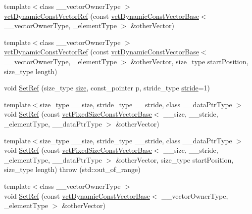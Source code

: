 \begin{DoxyCompactItemize}
\item 
{\footnotesize template$<$class \-\_\-\-\_\-vector\-Owner\-Type $>$ }\\\hyperlink{classvct_dynamic_const_vector_ref_a83a3e9d3b6116a72b45edf4999bc106a}{vct\-Dynamic\-Const\-Vector\-Ref} (const \hyperlink{classvct_dynamic_const_vector_base}{vct\-Dynamic\-Const\-Vector\-Base}$<$ \-\_\-\-\_\-vector\-Owner\-Type, \-\_\-element\-Type $>$ \&other\-Vector)
\item 
{\footnotesize template$<$class \-\_\-\-\_\-vector\-Owner\-Type $>$ }\\\hyperlink{classvct_dynamic_const_vector_ref_a168c520aca6ae854b40aea182694ef98}{vct\-Dynamic\-Const\-Vector\-Ref} (const \hyperlink{classvct_dynamic_const_vector_base}{vct\-Dynamic\-Const\-Vector\-Base}$<$ \-\_\-\-\_\-vector\-Owner\-Type, \-\_\-element\-Type $>$ \&other\-Vector, size\-\_\-type start\-Position, size\-\_\-type length)
\item 
void \hyperlink{classvct_dynamic_const_vector_ref_a25ea281066863d915ea0bd65092d94b5}{Set\-Ref} (size\-\_\-type \hyperlink{classvct_dynamic_const_vector_base_a79950d8cced7fd4e790d9ac2ca1c43a7}{size}, const\-\_\-pointer p, stride\-\_\-type \hyperlink{classvct_dynamic_const_vector_base_af0440ce847480b353e9f85edccc03158}{stride}=1)
\item 
{\footnotesize template$<$size\-\_\-type \-\_\-\-\_\-size, stride\-\_\-type \-\_\-\-\_\-stride, class \-\_\-\-\_\-data\-Ptr\-Type $>$ }\\void \hyperlink{classvct_dynamic_const_vector_ref_ada97f195fe90e1bbf50b51fe4452cacb}{Set\-Ref} (const \hyperlink{classvct_fixed_size_const_vector_base}{vct\-Fixed\-Size\-Const\-Vector\-Base}$<$ \-\_\-\-\_\-size, \-\_\-\-\_\-stride, \-\_\-element\-Type, \-\_\-\-\_\-data\-Ptr\-Type $>$ \&other\-Vector)
\item 
{\footnotesize template$<$size\-\_\-type \-\_\-\-\_\-size, stride\-\_\-type \-\_\-\-\_\-stride, class \-\_\-\-\_\-data\-Ptr\-Type $>$ }\\void \hyperlink{classvct_dynamic_const_vector_ref_aef35ff565181d7744063dfc809ebea55}{Set\-Ref} (const \hyperlink{classvct_fixed_size_const_vector_base}{vct\-Fixed\-Size\-Const\-Vector\-Base}$<$ \-\_\-\-\_\-size, \-\_\-\-\_\-stride, \-\_\-element\-Type, \-\_\-\-\_\-data\-Ptr\-Type $>$ \&other\-Vector, size\-\_\-type start\-Position, size\-\_\-type length)  throw (std\-::out\-\_\-of\-\_\-range)
\item 
{\footnotesize template$<$class \-\_\-\-\_\-vector\-Owner\-Type $>$ }\\void \hyperlink{classvct_dynamic_const_vector_ref_a39a73a7adfb2e8e7568d47d717a6d2a3}{Set\-Ref} (const \hyperlink{classvct_dynamic_const_vector_base}{vct\-Dynamic\-Const\-Vector\-Base}$<$ \-\_\-\-\_\-vector\-Owner\-Type, \-\_\-element\-Type $>$ \&other\-Vector)

\end{DoxyCompactItemize}
